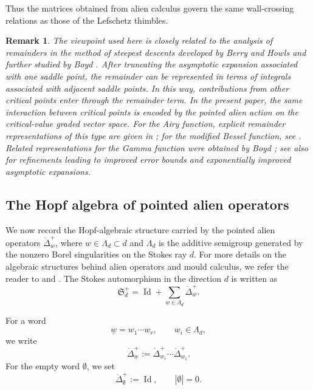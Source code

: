 \documentclass[11pt]{amsart}
\DeclareMathOperator{\Id}{Id}
\theoremstyle{plain}
\newtheorem{rmk}[thm]{Remark}
\begin{document}
Thus the matrices obtained from alien calculus govern the same wall-crossing relations as those of the Lefschetz thimbles. 

\begin{rmk} The viewpoint used here is closely related to the analysis of remainders in the method of steepest descents developed by Berry and Howls \cite{BerryHowls1991Hyperasymptotics} and further studied by Boyd \cite{Boyd1993SteepestDescents}. After truncating the asymptotic expansion associated with one saddle point, the remainder can be represented in terms of integrals associated with adjacent saddle points. In this way, contributions from other critical points enter through the remainder term. In the present paper, the same interaction between critical points is encoded by the pointed alien action on the critical-value graded vector space. For the Airy function, explicit remainder representations of this type are given in \cite[Sec.~5, especially (53)--(57)]{Boyd1993SteepestDescents}; for the modified Bessel function, see \cite[Sec.~6, especially (67)--(70)]{Boyd1993SteepestDescents}. Related representations for the Gamma function were obtained by Boyd \cite{Boyd1994Gamma}; see also \cite{Nemes2015Gamma} for refinements leading to improved error bounds and exponentially improved asymptotic expansions. \end{rmk}


\smallskip
\subsection{The Hopf algebra of pointed alien operators}
\label{subsec:alien-Hopf-plus}

We now record the Hopf-algebraic structure carried by the pointed alien
operators \(\dot\Delta_w^+\), where \(w\in\Lambda_d\subset d\) and
\(\Lambda_d\) is the additive semigroup generated by the nonzero Borel
singularities on the Stokes ray \(d\). For more details on the algebraic structures behind alien operators and
mould calculus, we refer the reader to \cite{Ecalle81a} and
\cite{Sauzin2009SaddleNodeMould}. The Stokes automorphism in the
direction \(d\) is written as
\begin{equation}\label{eq:Stokes-as-dotDelta-plus-series}
\mathfrak S_d^+
=
\Id+\sum_{w\in\Lambda_d}\dot\Delta_w^+ .
\end{equation}

For a word
\[
\underline{w}=w_1\cdots w_r,
\qquad
w_i\in\Lambda_d,
\]
we write
\begin{equation}\label{eq:Sauzin-word-convention-dotDelta-plus}
\dot\Delta_{\underline{w}}^{+}
:=
\dot\Delta_{w_r}^{+}\cdots \dot\Delta_{w_1}^{+}.
\end{equation}
For the empty word \(\emptyset\), we set
\[
\dot\Delta_{\emptyset}^{+}:=\Id,
\qquad
|\emptyset|=0.
\]
\end{document}
